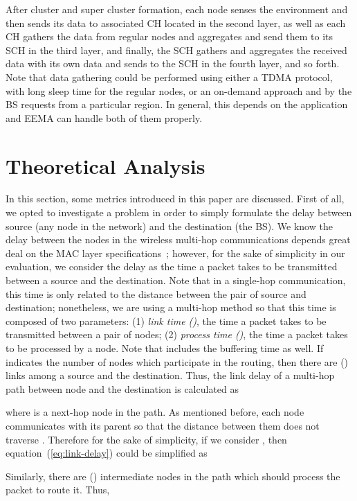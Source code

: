 \documentclass[journal]{IEEEtran}
\begin{document}
After cluster and super cluster formation, each node senses the environment and then sends its data to associated CH located in the second layer, as well as each CH gathers the data from regular nodes and aggregates and send them to its SCH in the third layer, and finally, the SCH gathers and aggregates the received data with its own data and sends to the SCH in the fourth layer, and so forth. Note that data gathering could be performed using either a TDMA protocol, with long sleep time for the regular nodes, or an on-demand approach and by the BS requests from a particular region. In general, this depends on the application and EEMA can handle both of them properly.

\section{Theoretical Analysis}
\label{sec:theo-anal}

In this section, some metrics introduced in this paper are discussed.  First of all, we opted to investigate a problem in order to simply formulate the delay between source (any node in the network) and the destination (the BS).  We know the delay between the nodes in the wireless multi-hop communications depends great deal on the MAC layer specifications~\cite{hanzo-delay}; however,  for the sake of simplicity in our evaluation, we consider  the delay as the time a packet takes to be transmitted between a source and the destination. Note that in a single-hop communication, this time is only related to the distance between the pair of source and destination; nonetheless, we are using a multi-hop method so that this time is composed of two parameters: (1) {\it link time ()}, the time a packet takes to be transmitted between a pair of nodes; (2) {\it process time ()}, the time a packet takes to be  processed by a node.  Note that  includes the buffering time as well.  If  indicates the number of nodes which participate in the routing, then there are () links among a source and the destination.  Thus, the link delay of a multi-hop path between node  and the destination is calculated as

where  is a next-hop node in the path.  As mentioned before, each node communicates with its parent so that the distance between them does not traverse .  Therefore for the sake of simplicity,  if we consider , then equation~(\ref{eq:link-delay}) could be simplified as

Similarly, there are () intermediate nodes in the path which should process the packet to route it. Thus,
\end{document}

